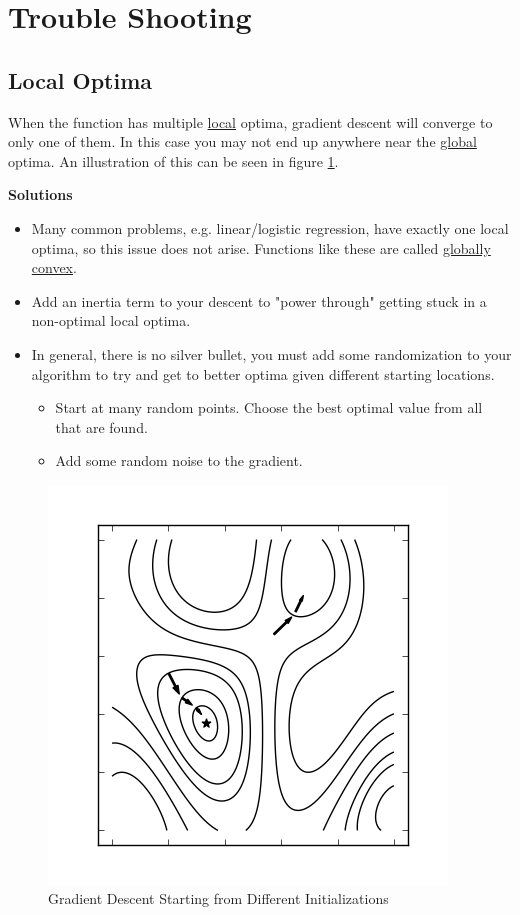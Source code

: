 \documentclass[a4paper, 12pt]{article}
\begin{document}
\section*{Trouble Shooting}

\subsection*{Local Optima}

When the function has multiple \underline{local} optima, gradient descent will converge to only one of them. In this case you may not end up anywhere near the \underline{global} optima. An illustration of this can be seen in figure \ref{fig:two_two_grad_desc}.

\vspace{1pc}

\textbf{Solutions}

\begin{itemize}
  \item Many common problems, e.g. linear/logistic regression, have exactly one local optima, so this issue does not arise. Functions like these are called \underline{globally convex}.
  \item Add an inertia term to your descent to "power through" getting stuck in a non-optimal local optima.
  \item In general, there is no silver bullet, you must add some randomization to your algorithm to try and get to better optima given different starting locations.
    \begin{itemize}
      \item Start at many random points. Choose the best optimal value from all that are found.
      \item Add some random noise to the gradient.
    \end{itemize}
\end{itemize}

\begin{figure}[H]
  \centering
    \includegraphics[scale=1]{images/two_var_gradient_descent_different_starts.png}
  \caption{Gradient Descent Starting from Different Initializations} \label{fig:two_two_grad_desc}
\end{figure}
\end{document}
